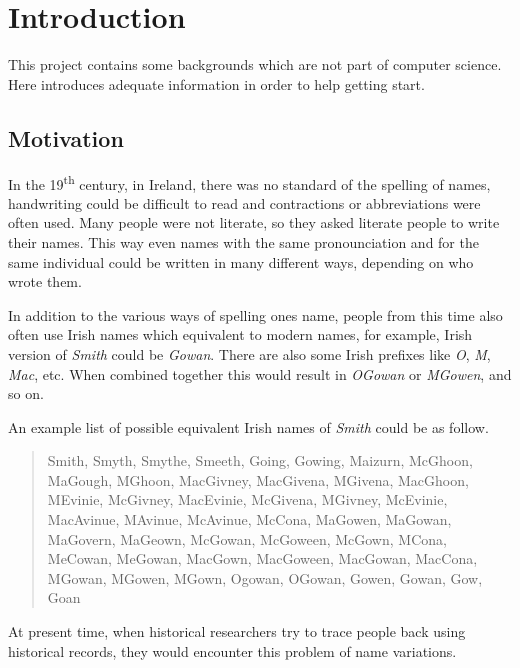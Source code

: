 \chapter{Introduction}
\label{ch:introduction}

This project contains some backgrounds which are not part of computer science.
Here introduces adequate information in order to help getting start.

\section{Motivation}

In the 19\textsuperscript{th} century, in Ireland, there was no standard
of the spelling of names, handwriting could be difficult to read
and contractions or abbreviations were often used. Many people were not literate,
so they asked literate people to write their names.
This way even names with the same pronounciation and for the same individual
could be written in many different ways, depending on who wrote them.

In addition to the various ways of spelling one\textquotesingle s name,
people from this time also often use Irish names which equivalent to modern names,
for example, Irish version of \emph{Smith} could be \emph{Gowan}.
There are also some Irish prefixes like \emph{O\textquotesingle}, \emph{M\textquotesingle}, \emph{Mac},
etc. When combined together this would result in \emph{O\textquotesingle Gowan} or
\emph{M\textquotesingle Gowen}, and so on.

An example list of possible equivalent Irish names of \emph{Smith}
could be as follow.

\begin{quotation} \noindent
Smith, Smyth, Smythe, Smeeth, Going, Gowing, Maizurn, McGhoon, MaGough,
M\textquotesingle Ghoon, MacGivney, MacGivena, M\textquotesingle Givena,
MacGhoon, M\textquotesingle Evinie, McGivney, MacEvinie, McGivena,
M\textquotesingle Givney, McEvinie, MacAvinue, M\textquotesingle Avinue,
McAvinue, McCona, MaGowen, MaGowan, MaGovern, MaGeown, McGowan, McGoween,
McGown, M\textquotesingle Cona, MeCowan, MeGowan, MacGown, MacGoween,
MacGowan, MacCona, M\textquotesingle Gowan, M\textquotesingle Gowen,
M\textquotesingle Gown, Ogowan, O\textquotesingle Gowan, Gowen,
Gowan, Gow, Goan
\end{quotation}

At present time, when historical researchers try to trace people back
using historical records, they would encounter this problem of
name variations.

